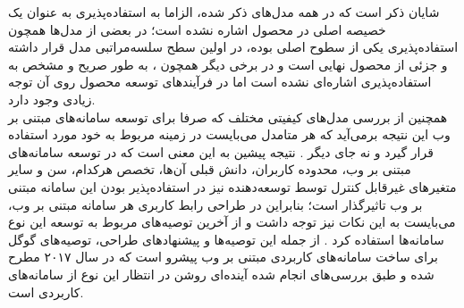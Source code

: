 شایان ذکر است که در همه مدل‌های ذکر شده، الزاما به استفاده‌پذیری به عنوان یک خصیصه اصلی در محصول اشاره نشده است؛ در بعضی از مدل‌ها همچون
استفاده‌پذیری یکی از سطوح اصلی بوده، در اولین سطح سلسه‌مراتبی مدل قرار داشته و جزئی از محصول نهایی است و در برخی دیگر همچون
،
به طور صریح و مشخص به استفاده‌پذیری اشاره‌ای نشده است اما در فرآیندهای توسعه محصول روی آن توجه زیادی وجود دارد.\\
همچنین از بررسی مدل‌های کیفیتی مختلف که صرفا برای توسعه سامانه‌های مبتنی بر وب این نتیجه برمی‌آید که هر متامدل می‌بایست در زمینه مربوط به خود مورد استفاده قرار گیرد و نه جای دیگر
\cite{noauthor_measuringu:_2018}.
نتیجه پیشین به این معنی است که در توسعه سامانه‌های مبتنی بر وب، محدوده کاربران، دانش قبلی آن‌ها، تخصص هرکدام، سن و سایر متغیرهای غیرقابل کنترل توسط توسعه‌دهنده نیز در استفاده‌پذیر بودن این سامانه مبتنی بر وب تاثیرگذار است؛ بنابراین در طراحی رابط کاربری هر سامانه مبتنی بر وب، می‌بایست به این نکات نیز توجه داشت و از آخرین توصیه‌های مربوط به توسعه این نوع سامانه‌ها استفاده کرد
\cite{albert_measuring_2013}.
از جمله این توصیه‌ها و پیشنهاد‌های طراحی، توصیه‌های گوگل برای ساخت سامانه‌های کاربردی مبتنی بر وب پیشرو
\cite{noauthor_progressive_nodate}
است که در سال ۲۰۱۷ مطرح شده و طبق بررسی‌های انجام شده آینده‌ای روشن در انتظار این نوع از سامانه‌های کاربردی است.

